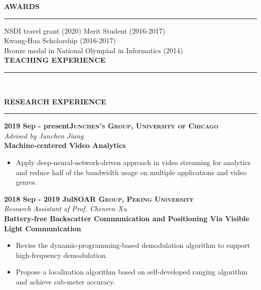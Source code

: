 \documentclass[a4paper,10pt,final]{memoir}
\newcommand{\myThemeColor}{Maroon}
\newcommand{\SmallSep}{\vspace{0.9em}}
\newcommand{\smallsep}{\vspace{0.45em}}
\newcommand{\CVSection}[1]
	{\large\textbf{\textsf{#1}}\par
	\smallsep\normalsize\normalfont}
\newcommand{\CVItem}[1]
	{\textbf{\color{\myThemeColor} #1}}
\begin{document}
\SmallSep

\CVSection{AWARDS}
\hrule
\SmallSep
    NSDI travel grant (2020)
    Merit Student (2016-2017)\\
	Kwang-Hua Scholarship (2016-2017)\\
	Bronze medal in National Olympiad in Informatics (2014)\\

\CVSection{TEACHING EXPERIENCE}
\hrule
\SmallSep
{}\\


\SmallSep
\CVSection{RESEARCH EXPERIENCE}
\hrule
\smallsep
\CVItem{2019 Sep - present\hfill\textsc{Junchen's Group, University of Chicago}}\\
\textit{Advised by Junchen Jiang}\\
\textbf{Machine-centered Video Analytics}
\vspace{-0.5em}
\begin{itemize}
    \vspace{-0.5em}
	\setlength{\itemsep}{0pt}
	\setlength{\parsep}{0pt}
	\setlength{\parskip}{0pt}
    \item Apply deep-neural-network-driven approach in video streaming for analytics and reduce half of the bandwidth usage on multiple applications and video genres.
\end{itemize}
\smallsep

\CVItem{2018 Sep - 2019 Jul\hfill\textsc{SOAR Group, Peking University}}\\
\textit{Research Assistant of Prof. Chenren Xu}\\
\textbf{Battery-free Backscatter Communication and Positioning Via Visible Light Communication}
\begin{itemize}
	\vspace{-0.5em}
	\setlength{\itemsep}{0pt}
	\setlength{\parsep}{0pt}
	\setlength{\parskip}{0pt}
	\item Revise the dynamic-programming-based demodulation algorithm to support high-frequency demodulation.
	\item Propose a localization algorithm based on self-developed ranging algorithm and achieve sub-meter accuracy.
\end{itemize}
\end{document}
